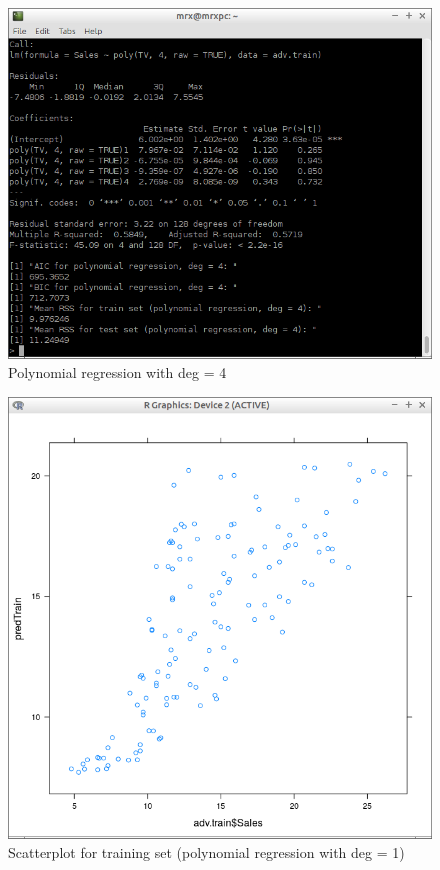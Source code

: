 \documentclass[10pt,a4paper]{article}
\begin{document}
\begin{figure}[H]
\centering
\includegraphics[width=140mm]{figures2/poly4.png}
\caption{Polynomial regression with deg = 4 \label{overflow}}
\end{figure}

\begin{figure}[H]
\centering
\includegraphics[width=140mm]{figures2/pltTr1.png}
\caption{Scatterplot for training set (polynomial regression with deg = 1) \label{overflow}}
\end{figure}
\end{document}
